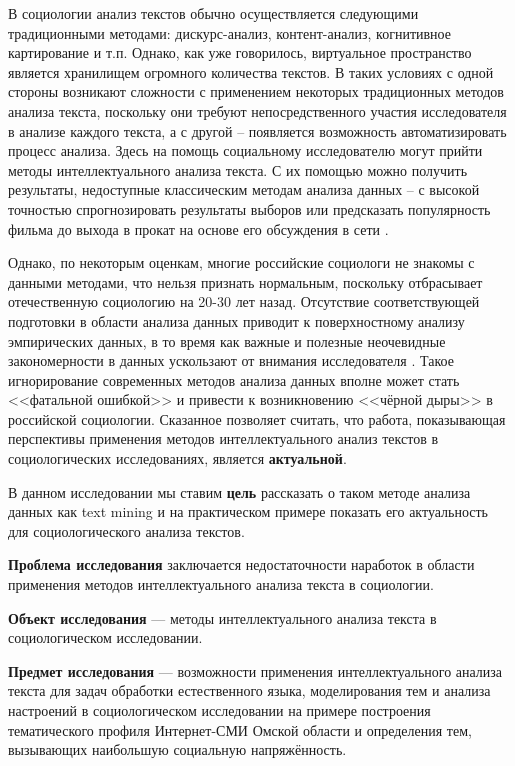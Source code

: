 В социологии анализ текстов обычно осуществляется следующими традиционными методами: дискурс-анализ, контент-анализ, когнитивное картирование и т.п. Однако, как уже говорилось, виртуальное пространство является хранилищем огромного количества текстов. В таких условиях с одной стороны возникают сложности с применением некоторых традиционных методов анализа текста, поскольку они требуют непосредственного участия исследователя в анализе каждого текста, а с другой -- появляется возможность автоматизировать процесс анализа. Здесь на помощь социальному исследователю могут прийти методы интеллектуального анализа текста. С их помощью можно получить результаты, недоступные классическим методам анализа данных -- с высокой точностью спрогнозировать результаты выборов \cite{venezuala} или предсказать популярность фильма до выхода в прокат на основе его обсуждения в сети \cite{hp_predicting}.

Однако, по некоторым оценкам, многие российские социологи не знакомы с данными методами, что нельзя признать нормальным, поскольку отбрасывает отечественную социологию на 20-30 лет назад. Отсутствие соответствующей подготовки в области анализа данных приводит к поверхностному анализу эмпирических данных, в то время как важные и полезные неочевидные закономерности в данных ускользают от внимания исследователя \cite{Davydov_Knowledge}. Такое игнорирование современных методов анализа данных вполне может стать <<фатальной ошибкой>> \cite{Davidov_fatal} и привести к возникновению <<чёрной дыры>> \cite{black_hole} в российской социологии. Сказанное позволяет считать, что работа, показывающая перспективы применения методов интеллектуального анализ текстов в социологических исследованиях, является \textbf{актуальной}.

В данном исследовании мы ставим \textbf{цель} рассказать о таком методе анализа данных как text mining и на практическом примере показать его актуальность для социологического анализа текстов.

\textbf{Проблема исследования} заключается недостаточности наработок в области применения методов интеллектуального анализа текста в социологии.

\textbf{Объект исследования} --- методы интеллектуального анализа текста в социологическом исследовании.

\textbf{Предмет исследования} --- возможности применения интеллектуального анализа текста для задач обработки естественного языка, моделирования тем и анализа настроений в социологическом исследовании на примере построения тематического профиля Интернет-СМИ Омской области и определения тем, вызывающих наибольшую социальную напряжённость.

\clearpage